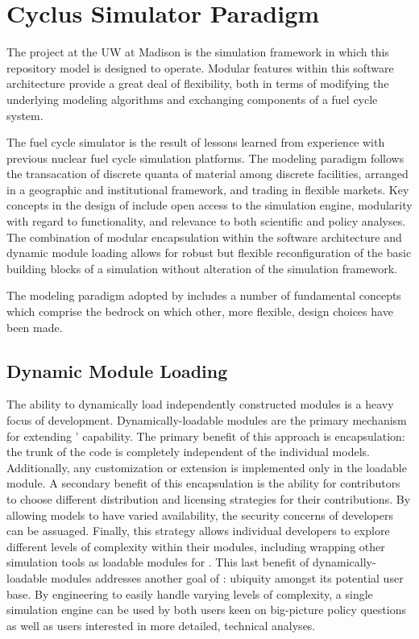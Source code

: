 \section{Cyclus Simulator Paradigm }

The \Cyclus project at the \gls{UW} at Madison is the 
simulation framework in which this repository model is designed to 
operate.  Modular features within this software architecture provide a 
great deal of flexibility, both in terms of modifying the underlying 
modeling algorithms and exchanging components of a fuel cycle system.

The \Cyclus fuel cycle simulator is the  result of lessons learned 
from experience with previous nuclear fuel cycle simulation platforms.  
The modeling paradigm follows the transacation of discrete quanta of 
material among discrete facilities, arranged in a geographic and 
institutional framework, and trading in
flexible markets. Key concepts in the design of \Cyclus include open
access to the simulation engine, modularity with regard to
functionality, and relevance to both scientific and policy
analyses. The combination of modular encapsulation within the
software architecture and dynamic module loading allows for robust but 
flexible reconfiguration of the basic building blocks of a simulation 
without alteration of the simulation framework.  

The modeling paradigm adopted by \Cyclus includes a number of
fundamental concepts which comprise the bedrock on which other, more
flexible, design choices have been made. 

\subsection{Dynamic Module Loading}

The ability to dynamically load independently constructed modules is a
heavy focus of \Cyclus development. Dynamically-loadable modules are
the primary mechanism for extending \Cyclus' capability. The primary
benefit of this approach is encapsulation: the trunk of the code is
completely independent of the individual models. Additionally, any
customization or extension is implemented only in the loadable
module. A secondary benefit of this encapsulation is the ability for
contributors to choose different distribution and licensing strategies
for their contributions. By allowing models to have varied
availability, the security concerns of developers can be
assuaged. Finally, this strategy allows individual developers to
explore different levels of complexity within their modules, including
wrapping other simulation tools as loadable modules for \Cyclus. This
last benefit of dynamically-loadable modules addresses another goal of
\Cyclus: ubiquity amongst its potential user base. By engineering
\Cyclus to easily handle varying levels of complexity, a single
simulation engine can be used by both users keen on big-picture policy
questions as well as users interested in more detailed, technical
analyses.

